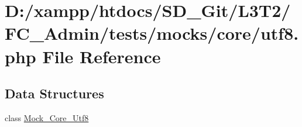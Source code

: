 \hypertarget{_admin_2tests_2mocks_2core_2_utf8_8php}{}\section{D\+:/xampp/htdocs/\+S\+D\+\_\+\+Git/\+L3\+T2/\+F\+C\+\_\+\+Admin/tests/mocks/core/utf8.php File Reference}
\label{_admin_2tests_2mocks_2core_2_utf8_8php}
\subsection*{Data Structures}
\begin{DoxyCompactItemize}
\item 
class \hyperlink{class_mock___core___utf8}{Mock\+\_\+\+Core\+\_\+\+Utf8}
\end{DoxyCompactItemize}
